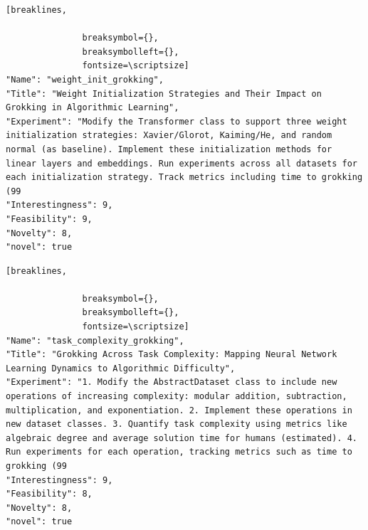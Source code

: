 \begin{tcolorbox}[
  breakable,
  colback  = blue!5!white,
  colframe = blue!75!black,
  title    = {Idea 9/50 - \texttt{weight\_init\_grokking}},
  fontupper=\scriptsize\ttfamily,
]
\begin{Verbatim}[breaklines,

               breaksymbol={},
               breaksymbolleft={},
               fontsize=\scriptsize]
"Name": "weight_init_grokking",
"Title": "Weight Initialization Strategies and Their Impact on Grokking in Algorithmic Learning",
"Experiment": "Modify the Transformer class to support three weight initialization strategies: Xavier/Glorot, Kaiming/He, and random normal (as baseline). Implement these initialization methods for linear layers and embeddings. Run experiments across all datasets for each initialization strategy. Track metrics including time to grokking (99
"Interestingness": 9,
"Feasibility": 9,
"Novelty": 8,
"novel": true
\end{Verbatim}
\end{tcolorbox}

\begin{tcolorbox}[
  breakable,
  colback  = blue!5!white,
  colframe = blue!75!black,
  title    = {Idea 10/50 - \texttt{task\_complexity\_grokking}},
  fontupper=\scriptsize\ttfamily,
]
\begin{Verbatim}[breaklines,

               breaksymbol={},
               breaksymbolleft={},
               fontsize=\scriptsize]
"Name": "task_complexity_grokking",
"Title": "Grokking Across Task Complexity: Mapping Neural Network Learning Dynamics to Algorithmic Difficulty",
"Experiment": "1. Modify the AbstractDataset class to include new operations of increasing complexity: modular addition, subtraction, multiplication, and exponentiation. 2. Implement these operations in new dataset classes. 3. Quantify task complexity using metrics like algebraic degree and average solution time for humans (estimated). 4. Run experiments for each operation, tracking metrics such as time to grokking (99
"Interestingness": 9,
"Feasibility": 8,
"Novelty": 8,
"novel": true
\end{Verbatim}
\end{tcolorbox}

